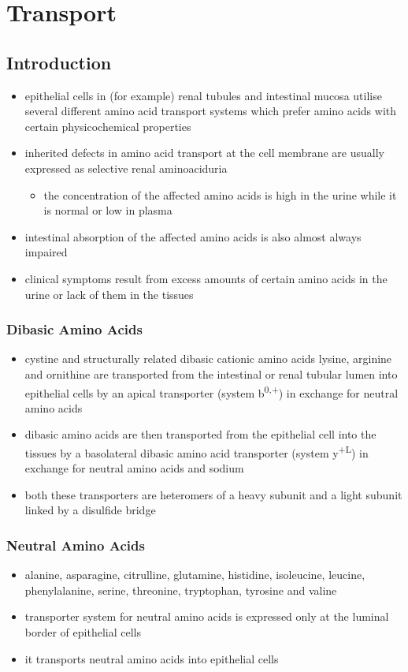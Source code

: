 \documentclass{scrartcl}
\begin{document}
\section{Transport}
\label{sec:org5b0d4b5}
\subsection{Introduction}
\label{sec:orgc1bb895}
\begin{itemize}
\item epithelial cells in (for example) renal tubules and intestinal
mucosa utilise several different amino acid transport systems which
prefer amino acids with certain physicochemical properties
\item inherited defects in amino acid transport at the cell membrane are
usually expressed as selective renal aminoaciduria
\begin{itemize}
\item the concentration of the affected amino acids is high in the urine
while it is normal or low in plasma
\end{itemize}
\item intestinal absorption of the affected amino acids is also almost
always impaired
\item clinical symptoms result from excess amounts of certain amino acids
in the urine or lack of them in the tissues
\end{itemize}
\subsubsection{Dibasic Amino Acids}
\label{sec:org951e59d}
\begin{itemize}
\item cystine and structurally related dibasic cationic amino acids
lysine, arginine and ornithine are transported from the intestinal
or renal tubular lumen into epithelial cells by an apical
transporter (system b\textsuperscript{0,+}) in exchange for neutral amino acids
\item dibasic amino acids are then transported from the epithelial cell
into the tissues by a basolateral dibasic amino acid transporter
(system y\textsuperscript{+L}) in exchange for neutral amino acids and sodium
\item both these transporters are heteromers of a heavy subunit and a
light subunit linked by a disulfide bridge
\end{itemize}

\subsubsection{Neutral  Amino Acids}
\label{sec:org0f952ad}
\begin{itemize}
\item alanine, asparagine, citrulline, glutamine, histidine, isoleucine,
leucine, phenylalanine, serine, threonine, tryptophan, tyrosine
and valine
\item transporter system for neutral amino acids is expressed only at the
luminal border of epithelial cells
\item it transports neutral amino acids into epithelial cells
\end{itemize}
\end{document}
